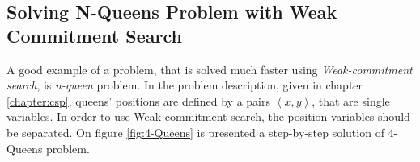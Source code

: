 \documentclass[../header]{subfiles}
\begin{document}
\providecommand{\rootdir}{..}


\subsection{Solving N-Queens Problem with Weak Commitment Search}
\label{sec:N-Queens-WCS}

A good example of a problem, that is solved much faster
using \emph{Weak-commitment search}, is \emph{n-queen} problem.
In the problem description, given in chapter \ref{chapter:csp}, queens' positions
are defined by a pairs $\left<x,y\right>$, that are single variables. In order to
use Weak-commitment search, the position variables should be separated.
On figure \ref{fig:4-Queens} is presented a step-by-step solution of
4-Queens problem.




\setcounter{subfiguregroup}{0}
\renewcommand\thesubfigure{\Roman{subfiguregroup}-\arabic{subfigure}}
\def\nextSubfigGroup{%
  \stepcounter{subfiguregroup}%
  \setcounter{subfigure}{0}%
}
\end{document}
